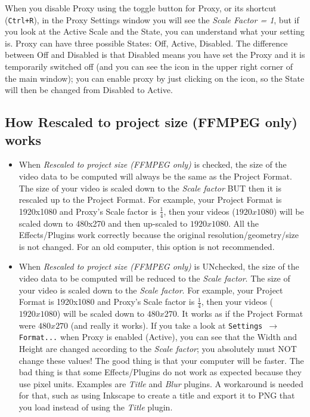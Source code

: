 When you disable Proxy using the toggle button for Proxy, or its shortcut (\texttt{Ctrl+R}), in the Proxy Settings window you will see the \textit{Scale Factor = 1}, but if you look at the Active Scale and the State, you can understand what your setting is.
Proxy can have three possible States: Off, Active, Disabled. The difference between Off and Disabled is that Disabled means you have set the Proxy and it is temporarily switched off (and you can see the icon in the upper right corner of the main window); you can enable proxy by just clicking on the icon, so the State will then be changed from Disabled to Active.

\subsection{How Rescaled to project size (FFMPEG only) works}%
\label{sub:rescaled_project_size_works}

\begin{itemize}
	\item When \textit{Rescaled to project size (FFMPEG only)} is checked, the size of the video data to be computed will always be the same as the Project Format. The size of your video is scaled down to the \textit{Scale factor} BUT then it is rescaled up to the Project Format. For example, your Project Format is 1920x1080 and Proxy's Scale factor is $\frac{1}{4}$, then your videos ($1920x1080$) will be scaled down to 480x270 and then up-scaled to $1920x1080$. All the Effects/Plugins work correctly because the original resolution/geometry/size is not changed. For an old computer, this option is not recommended.
	\item When \textit{Rescaled to project size (FFMPEG only)} is UNchecked, the size of the video data to be computed will be reduced to the \textit{Scale factor}. The size of your video is scaled down to the \textit{Scale factor}. For example, your Project Format is 1920x1080 and Proxy's Scale factor is $\frac{1}{4}$, then your videos ($1920x1080$) will be scaled down to $480x270$. It works as if the Project Format were $480x270$ (and really it works). If you take a look at \texttt{Settings $\rightarrow$ Format...} when Proxy is enabled (Active), you can see that the Width and Height are changed according to the \textit{Scale factor}; you absolutely must NOT change these values! The good thing is that your computer will be faster. The bad thing is that some Effects/Plugins do not work as expected because they use pixel units. Examples are \textit{Title} and \textit{Blur} plugins. A workaround is needed for that, such as using Inkscape to create a title and export it to PNG that you load instead of using the \textit{Title} plugin.

\end{itemize}


